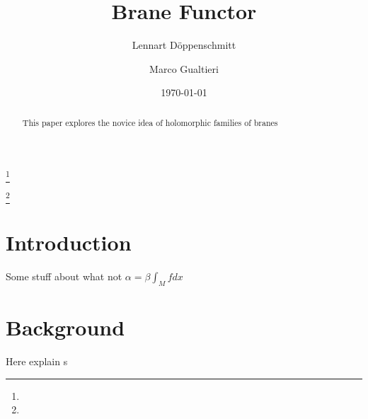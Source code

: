 \documentclass{amsart}
\begin{document}
\title{Brane Functor}


\author{Lennart Döppenschmitt}
\address{University of Zurich}
\curraddr{}
\thanks{}

\author{Marco Gualtieri}
\address{University of Toronto}
\curraddr{}
\thanks{}


\keywords{}

\date{\today}

\dedicatory{}

\begin{abstract}
    This paper explores the novice idea of holomorphic families of branes
\end{abstract}

\maketitle


\section{Introduction}

Some stuff about what not $α = β ∫_{M} f dx$

\section{Background}
Here explain s
\end{document}
